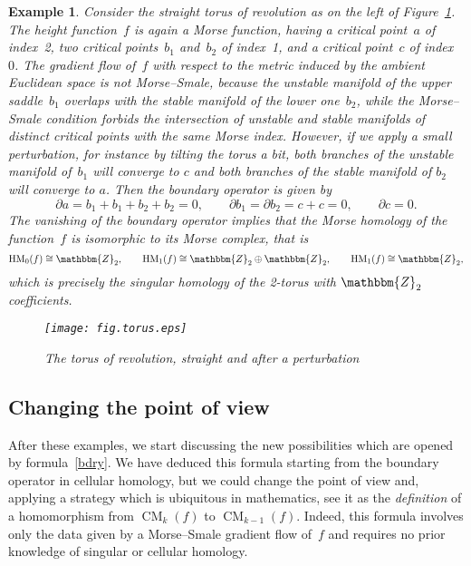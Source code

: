 \documentclass[12pt,twoside]{amsart}
\theoremstyle{plain}
\newtheorem{example}[theorem]{Example}
\numberwithin{figure}{section}
\numberwithin{equation}{section}
\def\CM{\operatorname{CM}}
\def\HM{\operatorname{HM}}
\def\ZZ{\mathbbm{Z}}
\def\pp{\partial}
\begin{document}
\begin{example}
{\rm
Consider the straight torus of revolution as on the left of Figure~\ref{fig.torus}. The height function~$f$ is again a Morse function, having a critical point~$a$ of index~2, two critical points~$b_1$ and~$b_2$ of index~1, and a critical point~$c$ of index~$0$. The gradient flow of~$f$ with respect to the metric induced by the ambient Euclidean space is not Morse--Smale, because the unstable manifold of the upper saddle~$b_1$ overlaps with the stable manifold of the lower one~$b_2$, 
while the Morse--Smale condition forbids the intersection of unstable and stable manifolds of distinct critical points with the same Morse index. However, if we apply a small perturbation, for instance by tilting the torus a bit, both branches of the unstable manifold of~$b_1$ will converge to $c$ and both branches of the stable manifold of $b_2$ will converge to $a$. Then
the boundary operator is given by
\[
\partial a =  b_1 + b_1 + b_2 + b_2= 0, \qquad \partial b_1 = \partial b_2 = c + c = 0, \qquad \pp c =0.
\]
The vanishing of the boundary operator implies that the Morse homology of the function~$f$ is isomorphic to its Morse complex, that is 
\[
\HM_0(f) \cong \ZZ_2, \qquad \HM_1(f) \cong \ZZ_2\oplus \ZZ_2, \qquad \HM_1(f) \cong \ZZ_2,
\]
which is precisely the singular homology of the 2-torus with $\ZZ_2$ coefficients.
}
\begin{figure}[h]   
 \begin{center}
  \leavevmode\texttt{[image: fig.torus.eps]}
 \end{center}
 \caption{The torus of revolution, straight and after a perturbation} \label{fig.torus}
\end{figure}
\end{example}

\subsection{Changing the point of view} 
After these examples, we start discussing the new possibilities which are opened by formula~\eqref{bdry}. 
We have deduced this formula starting from the boundary operator in cellular homology, but we could change the point of view and, applying a strategy which is ubiquitous in mathematics, see it as the 
{\em definition}\/ of a homomorphism from $\CM_k(f)$ to $\CM_{k-1}(f)$. Indeed, this formula involves only the data given by a Morse--Smale gradient flow of~$f$ and requires no prior knowledge of singular or cellular homology.
\end{document}

